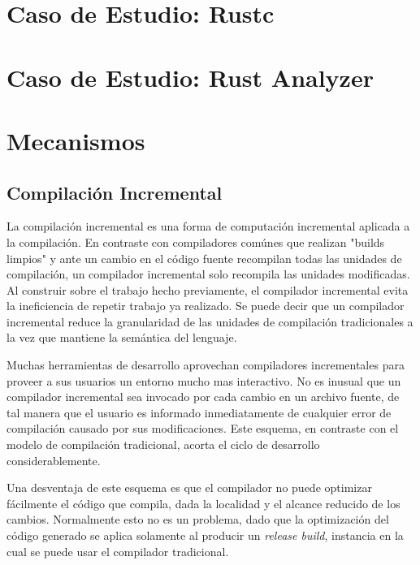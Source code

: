 \documentclass[12pt, a4paper]{report}
\begin{document}
\chapter*{Caso de Estudio: Rustc}

\chapter*{Caso de Estudio: Rust Analyzer}

\chapter*{Mecanismos}

  \section*{Compilación Incremental}

    La compilación incremental es una forma de computación incremental aplicada a la compilación.
    En contraste con compiladores comúnes que realizan "builds limpios" y ante un cambio en el código fuente recompilan todas las unidades de compilación, un compilador incremental solo recompila las unidades modificadas.
    Al construir sobre el trabajo hecho previamente, el compilador incremental evita la ineficiencia de repetir trabajo ya realizado.
    Se puede decir que un compilador incremental reduce la granularidad de las unidades de compilación tradicionales a la vez que mantiene la semántica del lenguaje.
    \cite{wiki_incremental_compiler}

    Muchas herramientas de desarrollo aprovechan compiladores incrementales para proveer a sus usuarios un entorno mucho mas interactivo.
    No es inusual que un compilador incremental sea invocado por cada cambio en un archivo fuente, de tal manera que el usuario es informado inmediatamente de cualquier error de compilación causado por sus modificaciones.
    Este esquema, en contraste con el modelo de compilación tradicional, acorta el ciclo de desarrollo considerablemente.
    \cite{wiki_incremental_compiler}

    Una desventaja de este esquema es que el compilador no puede optimizar fácilmente el código que compila, dada la localidad y el alcance reducido de los cambios.
    Normalmente esto no es un problema, dado que la optimización del código generado se aplica solamente al producir un \textit{release build}, instancia en la cual se puede usar el compilador tradicional.
    \cite{wiki_incremental_compiler}
\end{document}
